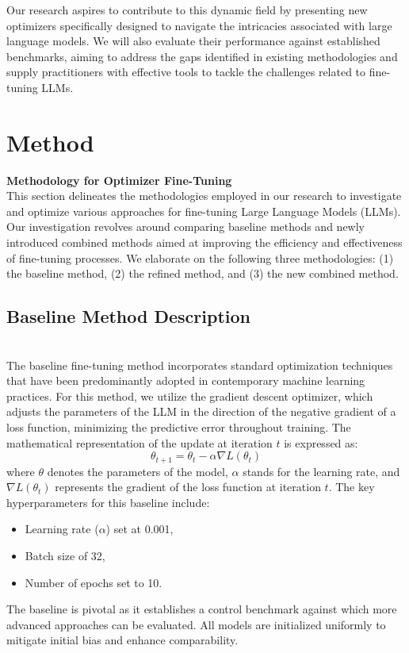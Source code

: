 \documentclass{article} %
\begin{document}
Our research aspires to contribute to this dynamic field by presenting new optimizers specifically designed to navigate the intricacies associated with large language models. We will also evaluate their performance against established benchmarks, aiming to address the gaps identified in existing methodologies and supply practitioners with effective tools to tackle the challenges related to fine-tuning LLMs.

\section{Method}
\label{sec:method}
\textbf{Methodology for Optimizer Fine-Tuning}  \\
This section delineates the methodologies employed in our research to investigate and optimize various approaches for fine-tuning Large Language Models (LLMs). Our investigation revolves around comparing baseline methods and newly introduced combined methods aimed at improving the efficiency and effectiveness of fine-tuning processes. We elaborate on the following three methodologies: (1) the baseline method, (2) the refined method, and (3) the new combined method.  \\
\subsection{Baseline Method Description}  \\
The baseline fine-tuning method incorporates standard optimization techniques that have been predominantly adopted in contemporary machine learning practices. For this method, we utilize the gradient descent optimizer, which adjusts the parameters of the LLM in the direction of the negative gradient of a loss function, minimizing the predictive error throughout training. The mathematical representation of the update at iteration $t$ is expressed as:  \
\begin{equation}  
\theta_{t+1} = \theta_{t} - \alpha \nabla L(\theta_t)  
\end{equation}  
where $\theta$ denotes the parameters of the model, $\alpha$ stands for the learning rate, and $\nabla L(\theta_t)$ represents the gradient of the loss function at iteration $t$. The key hyperparameters for this baseline include:  \
\begin{itemize}  
    \item Learning rate ($\alpha$) set at 0.001,  
    \item Batch size of 32,  
    \item Number of epochs set to 10.  
\end{itemize}  
The baseline is pivotal as it establishes a control benchmark against which more advanced approaches can be evaluated. All models are initialized uniformly to mitigate initial bias and enhance comparability.  \\
\end{document}
